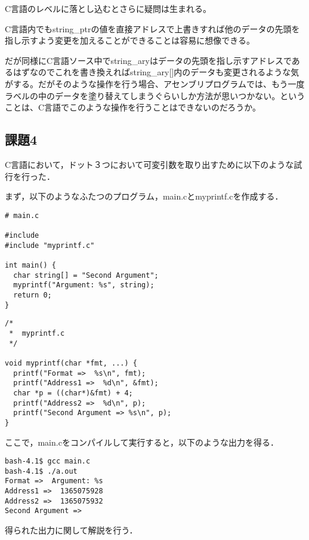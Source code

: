 \documentclass[a4j]{jarticle}
\begin{document}
C言語のレベルに落とし込むとさらに疑問は生まれる。

C言語内でもstring\_ptrの値を直接アドレスで上書きすれば他のデータの先頭を指し示すよう変更を加えることができることは容易に想像できる。

だが同様にC言語ソース中でstring\_aryはデータの先頭を指し示すアドレスであるはずなのでこれを書き換えればstring\_ary[]内のデータも変更されるような気がする。だがそのような操作を行う場合、アセンブリプログラムでは、もう一度ラベルの中のデータを塗り替えてしまうぐらいしか方法が思いつかない。ということは、C言語でこのような操作を行うことはできないのだろうか。

\subsection{課題4}


C言語において，ドット３つにおいて可変引数を取り出すために以下のような試行を行った．

まず，以下のようなふたつのプログラム，main.cとmyprintf.cを作成する．

\begin{verbatim}
# main.c

#include
#include "myprintf.c"
 
int main() {
  char string[] = "Second Argument";
  myprintf("Argument: %s", string);
  return 0;
}
\end{verbatim}

\begin{verbatim}
/*
 *  myprintf.c
 */

void myprintf(char *fmt, ...) {
  printf("Format =>  %s\n", fmt);
  printf("Address1 =>  %d\n", &fmt);
  char *p = ((char*)&fmt) + 4;
  printf("Address2 =>  %d\n", p);
  printf("Second Argument => %s\n", p);
}

\end{verbatim}

ここで，main.cをコンパイルして実行すると，以下のような出力を得る．

\begin{verbatim}
bash-4.1$ gcc main.c 
bash-4.1$ ./a.out 
Format =>  Argument: %s
Address1 =>  1365075928
Address2 =>  1365075932
Second Argument => 
\end{verbatim}

得られた出力に関して解説を行う．
\end{document}
